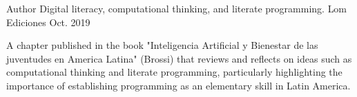 

\begin{cventries}

     \cventry
    {Author} %
    {Digital literacy, computational thinking, and literate programming.} %
    {Lom Ediciones} %
    {Oct. 2019} %
    {
      \begin{cvitems} %
        \item {A chapter published in the book "Inteligencia Artificial y Bienestar de las juventudes en America Latina" (Brossi) that reviews and reflects on ideas such as computational thinking and literate programming, particularly highlighting the importance of establishing programming as an elementary skill in Latin America.}
      \end{cvitems}
    }

\end{cventries}
